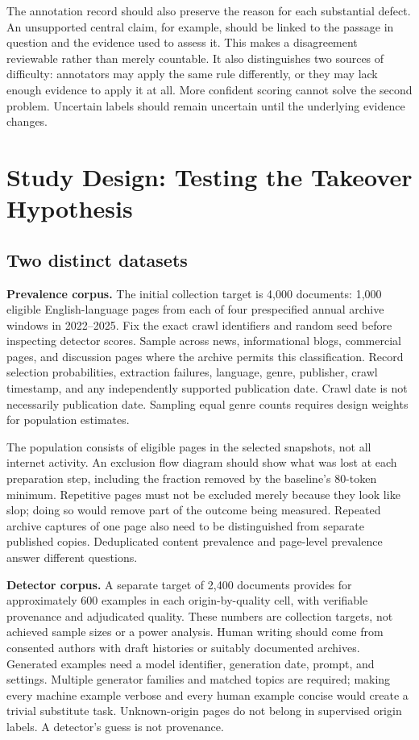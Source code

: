 \documentclass[11pt]{article}
\begin{document}
The annotation record should also preserve the reason for each substantial
defect. An unsupported central claim, for example, should be linked to the
passage in question and the evidence used to assess it. This makes a
disagreement reviewable rather than merely countable. It also distinguishes
two sources of difficulty: annotators may apply the same rule differently,
or they may lack enough evidence to apply it at all. More confident scoring
cannot solve the second problem. Uncertain labels should remain uncertain
until the underlying evidence changes.

\section{Study Design: Testing the Takeover Hypothesis}
\subsection{Two distinct datasets}
\textbf{Prevalence corpus.} The initial collection target is 4,000 documents:
1,000 eligible English-language pages from each of four prespecified annual
archive windows in 2022--2025. Fix the exact crawl identifiers and random seed
before inspecting detector scores. Sample across news, informational blogs,
commercial pages, and discussion pages where the archive permits this
classification. Record selection probabilities, extraction failures, language,
genre, publisher, crawl timestamp, and any independently supported publication
date. Crawl date is not necessarily publication date. Sampling equal genre
counts requires design weights for population estimates.

The population consists of eligible pages in the selected snapshots, not all
internet activity. An exclusion flow diagram should show what was lost at
each preparation step, including the fraction removed by the baseline's
80-token minimum. Repetitive pages must not be excluded merely because they
look like slop; doing so would remove part of the outcome being measured.
Repeated archive captures of one page also need to be distinguished from
separate published copies. Deduplicated content prevalence and page-level
prevalence answer different questions.

\textbf{Detector corpus.} A separate target of 2,400 documents provides for
approximately 600 examples in each origin-by-quality cell, with verifiable
provenance and adjudicated quality. These numbers are collection targets,
not achieved sample sizes or a power analysis. Human writing should come
from consented authors with draft histories or suitably documented archives.
Generated examples need a model identifier, generation date, prompt, and
settings. Multiple generator families and matched topics are required; making
every machine example verbose and every human example concise would create
a trivial substitute task. Unknown-origin pages do not belong in supervised
origin labels. A detector's guess is not provenance.
\end{document}
